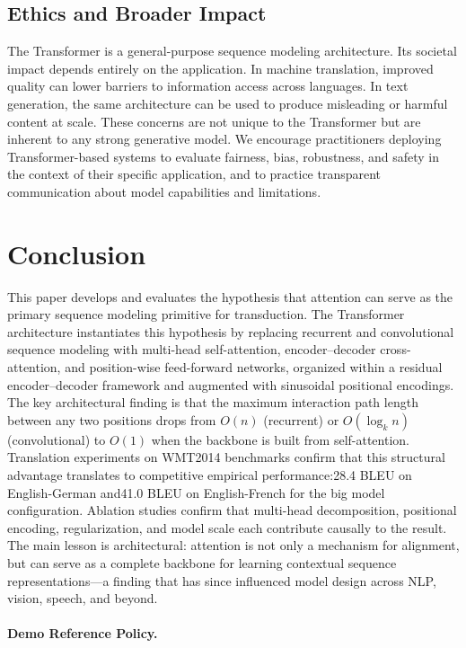 ﻿\documentclass{article}
\begin{document}
\subsection{Ethics and Broader Impact}

The Transformer is a general-purpose sequence modeling architecture. Its societal impact depends entirely on the application. In machine translation, improved quality can lower barriers to information access across languages. In text generation, the same architecture can be used to produce misleading or harmful content at scale. These concerns are not unique to the Transformer but are inherent to any strong generative model. We encourage practitioners deploying Transformer-based systems to evaluate fairness, bias, robustness, and safety in the context of their specific application, and to practice transparent communication about model capabilities and limitations.

\section{Conclusion}

This paper develops and evaluates the hypothesis that attention can serve as the primary sequence modeling primitive for transduction. The Transformer architecture instantiates this hypothesis by replacing recurrent and convolutional sequence modeling with multi-head self-attention, encoder--decoder cross-attention, and position-wise feed-forward networks, organized within a residual encoder--decoder framework and augmented with sinusoidal positional encodings. The key architectural finding is that the maximum interaction path length between any two positions drops from $O(n)$ (recurrent) or $O(\log_k n)$ (convolutional) to $O(1)$ when the backbone is built from self-attention. Translation experiments on WMT2014 benchmarks confirm that this structural advantage translates to competitive empirical performance:28.4 BLEU on English-German and41.0 BLEU on English-French for the big model configuration. Ablation studies confirm that multi-head decomposition, positional encoding, regularization, and model scale each contribute causally to the result. The main lesson is architectural: attention is not only a mechanism for alignment, but can serve as a complete backbone for learning contextual sequence representations---a finding that has since influenced model design across NLP, vision, speech, and beyond.


\paragraph{Demo Reference Policy.}
\label{sec:demo_refs}
\end{document}
